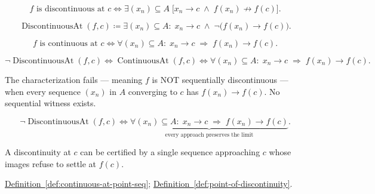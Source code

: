 \begin{remark*}
\[
f \text{ is discontinuous at } c \Longleftrightarrow
\exists (x_n)\subseteq A \;\bigl[x_n \to c \;\land\; f(x_n) \not\to f(c)\bigr].
\]
\end{remark*}

\begin{remark*}
\[
\operatorname{DiscontinuousAt}(f,c) \coloneqq \exists (x_n)\subseteq A:\; x_n\to c \;\land\; \neg\bigl(f(x_n)\to f(c)\bigr).
\]
\end{remark*}

\begin{remark*}
\[
f \text{ is continuous at } c \Longleftrightarrow
\forall (x_n)\subseteq A:\; x_n\to c \;\Rightarrow\; f(x_n)\to f(c).
\]
\end{remark*}

\begin{remark*}
\[
\neg \operatorname{DiscontinuousAt}(f,c)
\Longleftrightarrow
\operatorname{ContinuousAt}(f,c)
\Longleftrightarrow
\forall (x_n)\subseteq A:\; x_n\to c \;\Rightarrow\; f(x_n)\to f(c).
\]
\end{remark*}

\begin{remark*}
The characterization fails --- meaning $f$ is NOT sequentially discontinuous --- when every sequence $(x_n)$ in $A$ converging to $c$ has $f(x_n) \to f(c)$. No sequential witness exists.
\end{remark*}

\begin{remark*}
\[
\neg \operatorname{DiscontinuousAt}(f,c)
\Longleftrightarrow
\underbrace{\forall (x_n)\subseteq A:\;
  x_n\to c \;\Rightarrow\; f(x_n)\to f(c)
}_{\text{every approach preserves the limit}}.
\]
\end{remark*}

\begin{remark*}[Interpretation]
A discontinuity at $c$ can be certified by a single sequence approaching $c$ whose images refuse to settle at $f(c)$.
\end{remark*}

\begin{dependencies}
\hyperref[def:continuous-at-point-seq]{Definition~\ref{def:continuous-at-point-seq}}; \hyperref[def:point-of-discontinuity]{Definition~\ref{def:point-of-discontinuity}}.
\end{dependencies}


